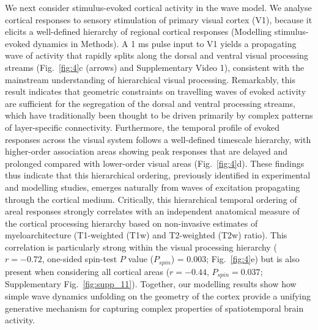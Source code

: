 \documentclass[sn-mathphys-num]{sn-jnl}%
\theoremstyle{thmstyleone}%
\theoremstyle{thmstyletwo}%
\theoremstyle{thmstylethree}%
\begin{document}
We next consider stimulus-evoked cortical activity in the wave model. 
We analyse cortical responses to sensory stimulation of primary visual cortex (V1), because it elicits a well-defined hierarchy of regional cortical responses\cite{felleman1991distributed,chaudhuri2015large} (Modelling stimulus-evoked dynamics in Methods). 
A 1 ms pulse input to V1 yields a propagating wave of activity that rapidly splits along the dorsal and ventral visual processing streams (Fig.~\ref{fig:4}c (arrows) and Supplementary Video 1), consistent with the mainstream understanding of hierarchical visual processing\cite{goodale1992separate}. 
Remarkably, this result indicates that geometric constraints on travelling waves of evoked activity are sufficient for the segregation of the dorsal and ventral processing streams, which have traditionally been thought to be driven primarily by complex patterns of layer-specific connectivity\cite{felleman1991distributed,goodale1992separate,markov2014anatomy}. 
Furthermore, the temporal profile of evoked responses across the visual system follows a well-defined timescale hierarchy, with higher-order association areas showing peak responses that are delayed and prolonged compared with lower-order visual areas (Fig.~\ref{fig:4}d). 
These findings thus indicate that this hierarchical ordering, previously identified in experimental and modelling studies\cite{chaudhuri2015large,hasson2008hierarchy,murray2014hierarchy}, emerges naturally from waves of excitation propagating through the cortical medium. Critically, this hierarchical temporal ordering of areal responses strongly correlates with an independent anatomical measure of the cortical processing hierarchy based on non-invasive estimates of myeloarchitecture (T1-weighted (T1w) and T2-weighted (T2w) ratio)\cite{glasser2011mapping,gao2020neuronal}. 
This correlation is particularly strong within the visual processing hierarchy ($ r = -0.72 $, one-sided spin-test $ P $ value ($P_{spin}$) = 0.003; Fig.~\ref{fig:4}e) but is also present when considering all cortical areas ($ r = -0.44 $, $ P_{spin} = 0.037 $; Supplementary Fig.~\ref{fig:supp_11}). 
Together, our modelling results show how simple wave dynamics unfolding on the geometry of the cortex provide a unifying generative mechanism for capturing complex properties of spatiotemporal brain activity.
\end{document}
